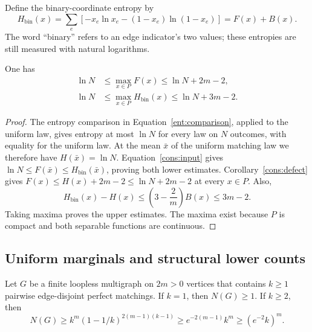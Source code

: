 Define the binary-coordinate entropy by
\[
 H_{\mathrm{bin}}(x)
   =\sum_e[-x_e\ln x_e-(1-x_e)\ln(1-x_e)]
   =F(x)+B(x).
\]
The word ``binary'' refers to an edge indicator's two values;
these entropies are still measured with natural logarithms.

\begin{corollary}
\label{cons:entropy-count}
One has
\begin{align}
 \ln N&\le\max_{x\in P}F(x)\le\ln N+2m-2,
       \label{cons:F-count}\\
 \ln N&\le\max_{x\in P}H_{\mathrm{bin}}(x)
                         \le\ln N+3m-2.
       \label{cons:binary-count}
\end{align}
\end{corollary}

\begin{proof}
The entropy comparison in Equation~\eqref{ent:comparison}, applied to
the uniform law, gives entropy at most \(\ln N\) for every law on
\(N\) outcomes, with equality for the uniform law.
At the mean \(\bar x\) of the uniform matching law we therefore have
\(H(\bar x)=\ln N\). Equation~\eqref{cons:input} gives
\(\ln N\le F(\bar x)\le H_{\mathrm{bin}}(\bar x)\), proving both
lower estimates. Corollary~\ref{cons:defect} gives
\(F(x)\le H(x)+2m-2\le\ln N+2m-2\) at every \(x\in P\).
Also,
\[
 H_{\mathrm{bin}}(x)-H(x)
 \le\left(3-\frac2m\right)B(x)\le3m-2.
\]
Taking maxima proves the upper estimates. The maxima exist because
\(P\) is compact and both separable functions are continuous.
\end{proof}

\subsection{Uniform marginals and structural lower counts}

\begin{theorem}
\label{cons:structural}
Let \(G\) be a finite loopless multigraph on \(2m>0\) vertices that
contains \(k\ge1\) pairwise edge-disjoint perfect matchings.
If \(k=1\), then \(N(G)\ge1\). If \(k\ge2\), then
\begin{equation}
 \label{cons:finite-order-count}
 N(G)\ge k^m(1-1/k)^{2(m-1)(k-1)}
       \ge e^{-2(m-1)}k^m
       \ge(e^{-2}k)^m.
\end{equation}
\end{theorem}

